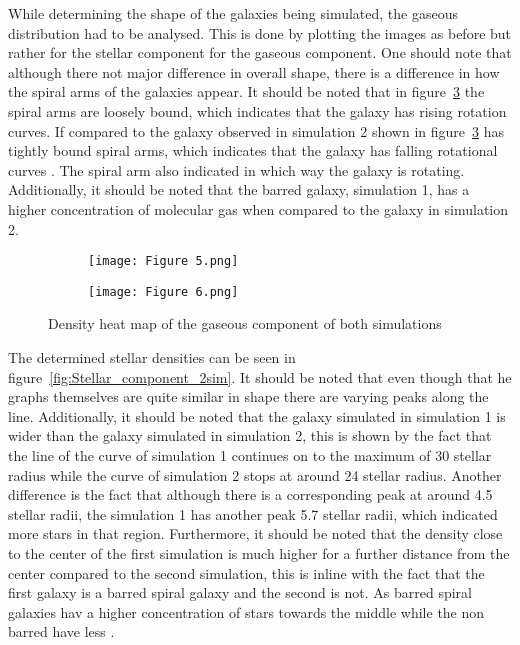 \documentclass[12pt, a4paper]{article}
\begin{document}
While determining the shape of the galaxies being simulated, the gaseous distribution had to be analysed. This is done by plotting the images as before but rather for the stellar component for the gaseous component. One should note that although there not major difference in overall shape, there is a difference in how the spiral arms of the galaxies appear. It should be noted that in figure~\ref{fig:Combined_gas} the spiral arms are loosely bound, which indicates that the galaxy has rising rotation curves. If compared to the galaxy observed in simulation 2 shown in figure~\ref{fig:Combined_gas} has tightly bound spiral arms, which indicates that the galaxy has falling rotational curves \parencite{PropertiesDiskGalaxies}. The spiral arm also indicated in which way the galaxy is rotating. Additionally, it should be noted that the barred galaxy, simulation 1, has a higher concentration of molecular gas when compared to the galaxy in simulation 2. 

\begin{figure}[H]
  \centering
  \begin{subfigure}{.5\textwidth}
    \centering
    \texttt{[image: Figure 5.png]}
    \label{fig:gas_simulation_1}
  \end{subfigure}%
  \begin{subfigure}{.5\textwidth}
    \centering
    \texttt{[image: Figure 6.png]}
    \label{fig:gas_simulation_2}
  \end{subfigure}
  \caption{Density heat map of the gaseous component of both simulations}
  \label{fig:Combined_gas}
\end{figure}

The determined stellar densities can be seen in figure~\ref{fig:Stellar_component_2sim}. It should be noted that even though that he graphs themselves are quite similar in shape there are varying peaks along the line. Additionally, it should be noted that the galaxy simulated in simulation 1 is wider than the galaxy simulated in simulation 2, this is shown by the fact that the line of the curve of simulation 1 continues on to the maximum of 30 stellar radius while the curve of simulation 2 stops at around 24 stellar radius. Another difference is the fact that although there is a corresponding peak at around 4.5 stellar radii, the simulation 1 has another peak 5.7 stellar radii, which indicated more stars in that region. Furthermore, it should be noted that the density close to the center of the first simulation is much higher for a further distance from the center compared to the second simulation, this is inline with the fact that the first galaxy is a barred spiral galaxy and the second is not. As barred spiral galaxies hav a higher concentration of stars towards the middle while the non barred have less \parencite{GALAXIES2023}.
\end{document}
